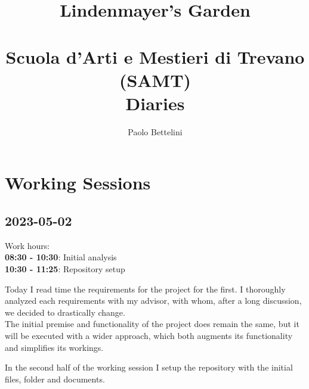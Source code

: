 \documentclass{article}
\title{%
    Lindenmayer's Garden \\
    \phantom{} \\
    \large Scuola d'Arti e Mestieri di Trevano (SAMT) \\
    \large Diaries
}
\author{Paolo Bettelini}
\date{}
\begin{document}

\begin{minipage}{0.55\textwidth}
    \maketitle
\end{minipage}
\begin{minipage}{0.45\textwidth}
    \vspace*{3cm}
\end{minipage}

\vspace*{1cm}

\tableofcontents

\pagebreak

\section{Working Sessions}

\subsection{2023-05-02}

Work hours:\\
\textbf{08:30 - 10:30}: Initial analysis \\
\textbf{10:30 - 11:25}: Repository setup

Today I read time the requirements for the project for the first.
I thoroughly analyzed each requirements with my advisor, with whom, after a long discussion,
we decided to drastically change. \\
The initial premise and functionality of the project does remain the same, but it will be
executed with a wider approach, which both augments its functionality and simplifies its workings.

In the second half of the working session I setup the repository with the initial files, folder and documents.
\end{document}
